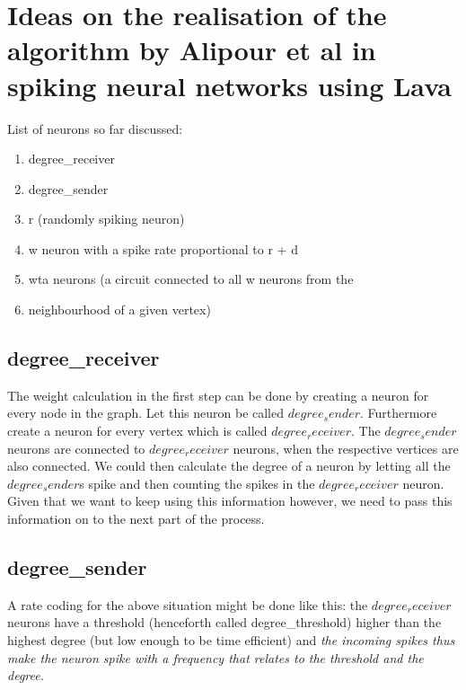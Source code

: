 \chapter{Ideas on the realisation of the algorithm by Alipour et al
in spiking neural networks using Lava}\label{chap:ideas_v1}
List of neurons so far discussed:
\begin{enumerate}
    \item degree\_receiver
    \item degree\_sender
    \item r (randomly spiking neuron)
    \item w neuron with a spike rate proportional to r + d
    \item wta neurons (a circuit connected to all w neurons from the
    \item neighbourhood of a given vertex)
\end{enumerate}

\section{degree\_receiver}\label{sec:degree_receiver}
The weight calculation in the first step can be done by creating a neuron for
every node in the graph. Let this neuron be called $degree_sender$. Furthermore
create a neuron for every vertex which is called $degree_receiver$. The
$degree_sender$ neurons are connected to $degree_receiver$ neurons, when the
respective vertices are also connected. We could then calculate the degree of a
neuron by letting all the $degree_sender$s spike and then counting the spikes in
the $degree_receiver$ neuron. Given that we want to keep using this information
however, we need to pass this information on to the next part of the process.

\section{degree\_sender}\label{sec:degree_sender}
A rate coding for the above situation might be done like this: the
$degree_receiver$ neurons have a threshold (henceforth called
degree\_threshold) higher than the highest degree (but low enough to be time
efficient) and \textit{the incoming spikes thus make the neuron spike with a frequency
that relates to the threshold and the degree.}
